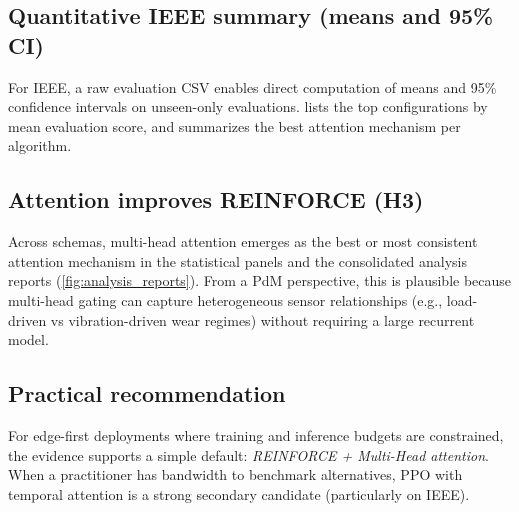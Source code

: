 \documentclass[11pt]{article}
\newcommand{\autorlTableRoot}{tables}
\renewcommand{\autorlTableRoot}{paper/tables}%
\begin{document}
\subsection{Quantitative IEEE summary (means and 95\% CI)}
\label{sec:ieee_summary}
For IEEE, a raw evaluation CSV enables direct computation of means and 95\% confidence intervals on unseen-only evaluations.  lists the top configurations by mean evaluation score, and  summarizes the best attention mechanism per algorithm.

\begin{table}[t]
	\centering
	\caption{Top IEEE configurations on unseen-only evaluations (mean and 95\% CI, aggregated across rounds and test files). Numbers are rounded to three decimals.}
	\label{tab:ieee_top10}
	
\end{table}

\begin{table}[t]
	\centering
	\caption{IEEE unseen-only: best attention mechanism per algorithm (mean evaluation score and 95\% CI).}
	\label{tab:ieee_best_attn}
	
\end{table}

\subsection{Attention improves REINFORCE (H3)}
Across schemas, multi-head attention emerges as the best or most consistent attention mechanism in the statistical panels and the consolidated analysis reports (\cref{fig:analysis_reports}). From a PdM perspective, this is plausible because multi-head gating can capture heterogeneous sensor relationships (e.g., load-driven vs vibration-driven wear regimes) without requiring a large recurrent model.

\subsection{Practical recommendation}
For edge-first deployments where training and inference budgets are constrained, the evidence supports a simple default: \emph{REINFORCE + Multi-Head attention}. When a practitioner has bandwidth to benchmark alternatives, PPO with temporal attention is a strong secondary candidate (particularly on IEEE).
\end{document}
